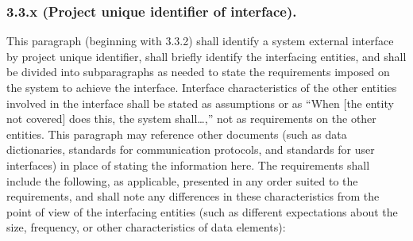 \subsubsection{3.3.x (Project unique identifier of interface).}

This paragraph (beginning with 3.3.2) shall identify a system external
interface by project unique identifier, shall briefly identify the
interfacing entities, and shall be divided into subparagraphs as needed
to state the requirements imposed on the system to achieve the
interface. Interface characteristics of the other entities involved in
the interface shall be stated as assumptions or as ``When {[}the entity
not covered{]} does this, the system shall\ldots{},'' not as
requirements on the other entities. This paragraph may reference other
documents (such as data dictionaries, standards for communication
protocols, and standards for user interfaces) in place of stating the
information here. The requirements shall include the following, as
applicable, presented in any order suited to the requirements, and shall
note any differences in these characteristics from the point of view of
the interfacing entities (such as different expectations about the size,
frequency, or other characteristics of data elements):

